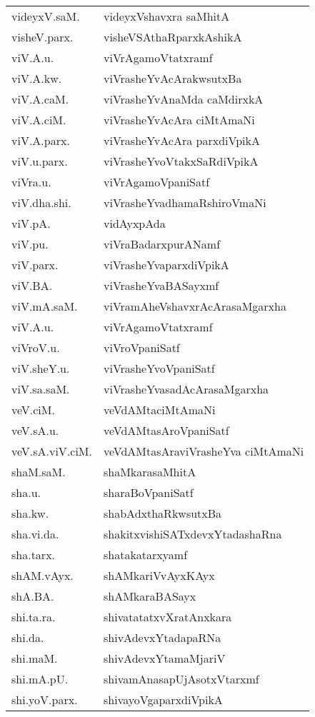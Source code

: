 \begin{longtable}{ll}
videyxV.saM. & videyxVshavxra saMhitA\\
visheV.parx. & visheVSAthaRparxkAshikA\\
viV.A.u. & viVrAgamoVtatxramf\\
viV.A.kw. & viVrasheYvAcArakwsutxBa\\
viV.A.caM. & viVrasheYvAnaMda caMdirxkA\\
viV.A.ciM. & viVrasheYvAcAra ciMtAmaNi\\
viV.A.parx. & viVrasheYvAcAra parxdiVpikA\\
viV.u.parx. & viVrasheYvoVtakxSaRdiVpikA\\
viVra.u. & viVrAgamoVpaniSatf\\
viV.dha.shi. & viVrasheYvadhamaRshiroVmaNi\\
viV.pA. & vidAyxpAda\\
viV.pu. & viVraBadarxpurANamf\\
viV.parx. & viVrasheYvaparxdiVpikA\\
viV.BA. & viVrasheYvaBASayxmf\\
viV.mA.saM. & viVramAheVshavxrAcArasaMgarxha\\
viV.A.u. & viVrAgamoVtatxramf\\
viVroV.u. & viVroVpaniSatf\\
viV.sheY.u. & viVrasheYvoVpaniSatf\\
viV.sa.saM. & viVrasheYvasadAcArasaMgarxha\\
veV.ciM. & veVdAMtaciMtAmaNi\\
veV.sA.u. & veVdAMtasAroVpaniSatf\\
veV.sA.viV.ciM. & veVdAMtasAraviVrasheYva ciMtAmaNi\\
shaM.saM. & shaMkarasaMhitA\\
sha.u. & sharaBoVpaniSatf\\
sha.kw. & shabAdxthaRkwsutxBa\\
sha.vi.da. & shakitxvishiSATxdevxYtadashaRna\\
sha.tarx. & shatakatarxyamf\\
shAM.vAyx. & shAMkariVvAyxKAyx\\
shA.BA. & shAMkaraBASayx\\
shi.ta.ra. & shivatatatxvXratAnxkara\\
shi.da. & shivAdevxYtadapaRNa\\
shi.maM. & shivAdevxYtamaMjariV\\
shi.mA.pU. & shivamAnasapUjAsotxVtarxmf\\
shi.yoV.parx. & shivayoVgaparxdiVpikA\\

\end{longtable}
